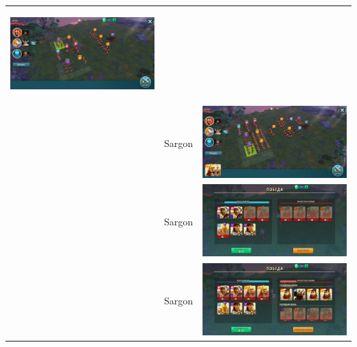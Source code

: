 \begin{longtable}{|c|c|c|}
    \hypertarget{fight36}{\includegraphics[width=0.75\linewidth]{./parts/media/TreasureHunt/36/sargon/photo_2022-04-07_13-16-43.jpg}} \\
    & Sargon &
    \includegraphics[width=0.75\linewidth]{./parts/media/TreasureHunt/36/sargon/photo_2022-04-07_13-16-23.jpg} \\
    & Sargon &
    \includegraphics[width=0.75\linewidth]{./parts/media/TreasureHunt/36/sargon/photo_2022-04-07_13-16-46.jpg} \\
    & Sargon &
    \includegraphics[width=0.75\linewidth]{./parts/media/TreasureHunt/36/sargon/photo_2022-04-07_13-16-40.jpg} \\

\end{longtable}
